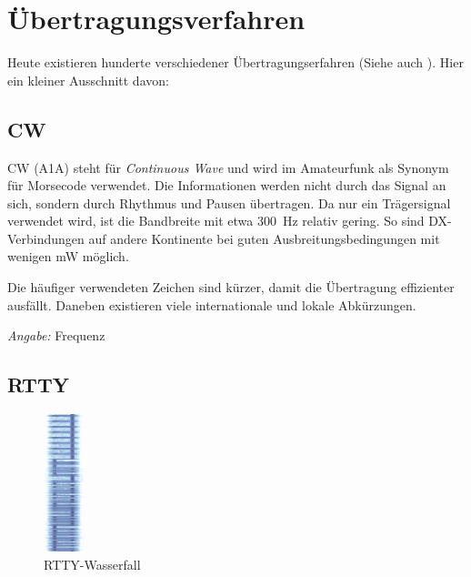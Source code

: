\chapter{Übertragungsverfahren}

Heute existieren hunderte verschiedener Übertragungserfahren (Siehe auch ). Hier ein kleiner Ausschnitt davon:

\section{CW}
CW (A1A) steht für \textit{Continuous Wave} und wird im Amateurfunk als Synonym für Morsecode verwendet. Die Informationen werden nicht durch das Signal an sich, sondern durch Rhythmus und Pausen übertragen. Da nur ein Trägersignal verwendet wird, ist die Bandbreite mit etwa 300 Hz relativ gering. So sind DX-Verbindungen auf andere Kontinente bei guten Ausbreitungsbedingungen mit wenigen mW möglich.

Die häufiger verwendeten Zeichen sind kürzer, damit die Übertragung effizienter ausfällt. Daneben existieren viele internationale und lokale Abkürzungen.

\textit{Angabe:} Frequenz

\section{RTTY}
\begin{figure}
 \centering
 \includegraphics[height=4cm]{png/RTTY-BaudlineSmall.png}
 \caption{RTTY-Wasserfall}
 \label{fig:rttyWaterfall}
\end{figure}


